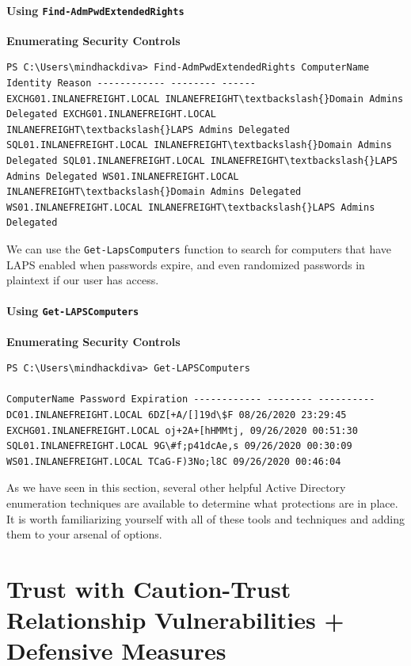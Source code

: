 \subsubsection{Using \texttt{Find-AdmPwdExtendedRights}}
\textbf{Enumerating Security Controls}
\begin{notebox}
\begin{verbatim}
PS C:\Users\mindhackdiva> Find-AdmPwdExtendedRights ComputerName Identity Reason ------------ -------- ------ EXCHG01.INLANEFREIGHT.LOCAL INLANEFREIGHT\textbackslash{}Domain Admins Delegated EXCHG01.INLANEFREIGHT.LOCAL INLANEFREIGHT\textbackslash{}LAPS Admins Delegated SQL01.INLANEFREIGHT.LOCAL INLANEFREIGHT\textbackslash{}Domain Admins Delegated SQL01.INLANEFREIGHT.LOCAL INLANEFREIGHT\textbackslash{}LAPS Admins Delegated WS01.INLANEFREIGHT.LOCAL INLANEFREIGHT\textbackslash{}Domain Admins Delegated WS01.INLANEFREIGHT.LOCAL INLANEFREIGHT\textbackslash{}LAPS Admins Delegated 
\end{verbatim}
\end{notebox}
We can use the \texttt{Get-LapsComputers} function to search for computers that have LAPS enabled when passwords expire, and even randomized passwords in plaintext if our user has access.

\subsubsection{Using \texttt{Get-LAPSComputers}}
\textbf{Enumerating Security Controls}
\begin{notebox}
\begin{verbatim}
PS C:\Users\mindhackdiva> Get-LAPSComputers

ComputerName Password Expiration ------------ -------- ---------- DC01.INLANEFREIGHT.LOCAL 6DZ[+A/[]19d\$F 08/26/2020 23:29:45 EXCHG01.INLANEFREIGHT.LOCAL oj+2A+[hHMMtj, 09/26/2020 00:51:30 SQL01.INLANEFREIGHT.LOCAL 9G\#f;p41dcAe,s 09/26/2020 00:30:09 WS01.INLANEFREIGHT.LOCAL TCaG-F)3No;l8C 09/26/2020 00:46:04 
\end{verbatim}
\end{notebox}

As we have seen in this section, several other helpful Active Directory enumeration techniques are available to determine what protections are in place. It is worth familiarizing yourself with all of these tools and techniques and adding them to your arsenal of options. 

\chapter{Trust with Caution-Trust Relationship Vulnerabilities + Defensive Measures}

